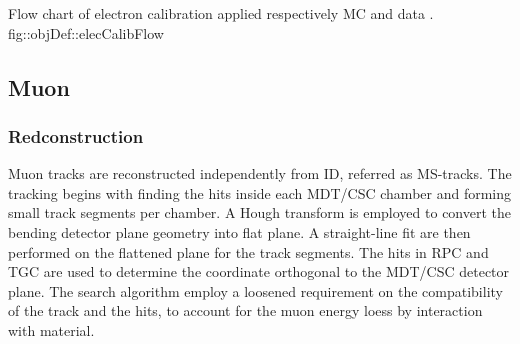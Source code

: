 
{Flow chart of electron calibration applied respectively MC and data \cite{161_egammaCalibRun1}.}
{fig::objDef::elecCalibFlow}




\subsection{Muon} \label{sec::objDef::muons}
\subsubsection{Redconstruction} \label{sec::objDef::muons::reco}
Muon tracks are reconstructed independently from ID, referred as MS-tracks. 
The tracking begins with finding the hits inside each MDT/CSC chamber and forming small track segments per chamber. A Hough transform is employed to convert the bending detector plane geometry into flat plane. A straight-line fit are then performed on the flattened plane for the track segments. 
The hits in RPC and TGC are used to determine the coordinate orthogonal to the MDT/CSC detector plane. The search algorithm employ a loosened requirement on the compatibility of the track and the hits, to account for the muon energy loess by interaction with material.

